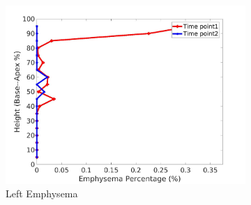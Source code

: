 \begin{figure}[H]
\begin{subfigure}{.42\linewidth}
  \includegraphics[width=\linewidth,trim={{.0\wd0} {.0\wd0} {.0\wd0} {.0\wd0}},clip]{Appendix/Image_AppexA/BaseToApex/IPF10LeftLungEmphysemaDiseaseAgainstHeight.jpg} %
  \caption{Left Emphysema}
  \label{fig:IPF10DiseaseAgainstHeight-g} 
\end{subfigure} 
\begin{subfigure}{.42\linewidth}%

\end{subfigure}
\end{figure}
